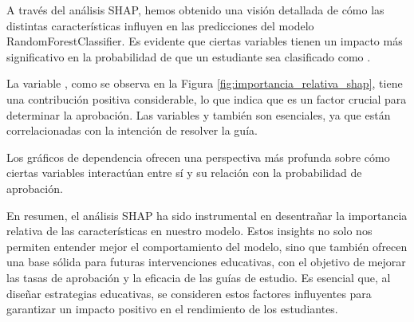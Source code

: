 A través del análisis SHAP, hemos obtenido una visión detallada de cómo las distintas características influyen en las predicciones del modelo RandomForestClassifier. Es evidente que ciertas variables tienen un impacto más significativo en la probabilidad de que un estudiante sea clasificado como \textit{}.

La variable , como se observa en la Figura \ref{fig:importancia_relativa_shap}, tiene una contribución positiva considerable, lo que indica que es un factor crucial para determinar la aprobación. Las variables  y  también son esenciales, ya que están correlacionadas con la intención de resolver la guía.

Los gráficos de dependencia ofrecen una perspectiva más profunda sobre cómo ciertas variables interactúan entre sí y su relación con la probabilidad de aprobación.

En resumen, el análisis SHAP ha sido instrumental en desentrañar la importancia relativa de las características en nuestro modelo. Estos insights no solo nos permiten entender mejor el comportamiento del modelo, sino que también ofrecen una base sólida para futuras intervenciones educativas, con el objetivo de mejorar las tasas de aprobación y la eficacia de las guías de estudio. Es esencial que, al diseñar estrategias educativas, se consideren estos factores influyentes para garantizar un impacto positivo en el rendimiento de los estudiantes.